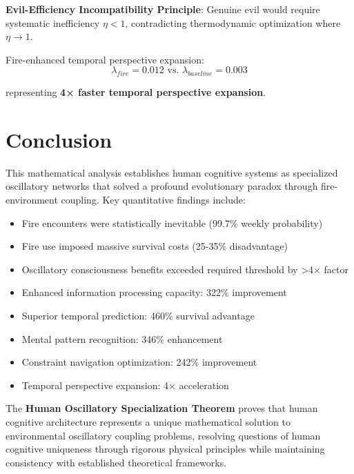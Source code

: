 \documentclass[11pt]{article}
\theoremstyle{remark}
\begin{document}
\textbf{Evil-Efficiency Incompatibility Principle}: Genuine evil would require systematic inefficiency $\eta < 1$, contradicting thermodynamic optimization where $\eta \to 1$.

Fire-enhanced temporal perspective expansion:
$$\lambda_{fire} = 0.012 \text{ vs. } \lambda_{baseline} = 0.003$$

representing \textbf{4× faster temporal perspective expansion}.

\section{Conclusion}

This mathematical analysis establishes human cognitive systems as specialized oscillatory networks that solved a profound evolutionary paradox through fire-environment coupling. Key quantitative findings include:

\begin{itemize}
\item Fire encounters were statistically inevitable (99.7\% weekly probability)
\item Fire use imposed massive survival costs (25-35\% disadvantage)
\item Oscillatory consciousness benefits exceeded required threshold by >4× factor
\item Enhanced information processing capacity: 322\% improvement
\item Superior temporal prediction: 460\% survival advantage
\item Mental pattern recognition: 346\% enhancement
\item Constraint navigation optimization: 242\% improvement
\item Temporal perspective expansion: 4× acceleration
\end{itemize}

The \textbf{Human Oscillatory Specialization Theorem} proves that human cognitive architecture represents a unique mathematical solution to environmental oscillatory coupling problems, resolving questions of human cognitive uniqueness through rigorous physical principles while maintaining consistency with established theoretical frameworks.
\end{document}

